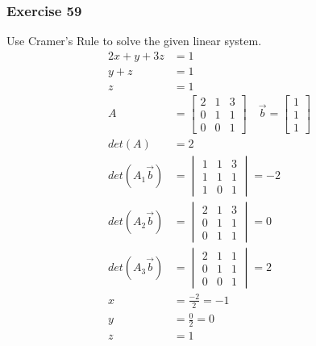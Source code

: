 \documentclass{math}
\begin{document}
\subsubsection*{Exercise 59}
Use Cramer's Rule to solve the given linear system.
\begin{align*}
  2x+y+3z &= 1 \\
  y+z &= 1 \\
  z &= 1 \\
  A &= \begin{bmatrix}
    2 & 1 & 3 \\
    0 & 1 & 1 \\
    0 & 0 & 1
  \end{bmatrix}\quad \vec{b} = \begin{bmatrix}1 \\ 1 \\ 1\end{bmatrix} \\
  det(A) &= 2 \\
  det(A_1\vec{b}) &= \begin{vmatrix}
    1 & 1 & 3 \\
    1 & 1 & 1 \\
    1 & 0 & 1
  \end{vmatrix} = -2 \\
  det(A_2\vec{b}) &= \begin{vmatrix}
    2 & 1 & 3 \\
    0 & 1 & 1 \\
    0 & 1 & 1
  \end{vmatrix} = 0 \\
  det(A_3\vec{b}) &= \begin{vmatrix}
    2 & 1 & 1 \\
    0 & 1 & 1 \\
    0 & 0 & 1
  \end{vmatrix} = 2 \\
  x &= \frac{-2}{2} = -1 \\
  y &= \frac{0}{2} = 0 \\
  z &= 1
\end{align*}
\end{document}
